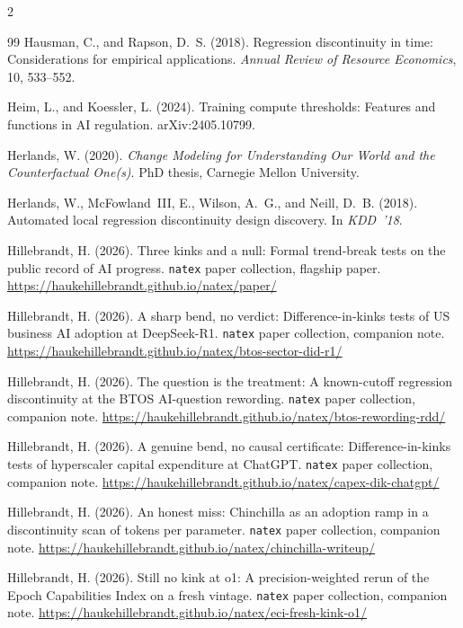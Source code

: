 \documentclass[11pt]{article}
\newcommand{\natex}{\texttt{natex}}
\begin{document}
\begin{multicols}{2}
\begin{thebibliography}{99}
Hausman, C., and Rapson, D.~S. (2018).
Regression discontinuity in time: Considerations for empirical applications.
\emph{Annual Review of Resource Economics}, 10, 533--552.

Heim, L., and Koessler, L. (2024).
Training compute thresholds: Features and functions in AI regulation.
arXiv:2405.10799.

Herlands, W. (2020).
\emph{Change Modeling for Understanding Our World and the Counterfactual
One(s)}.
PhD thesis, Carnegie Mellon University.

Herlands, W., McFowland~III, E., Wilson, A.~G., and Neill, D.~B. (2018).
Automated local regression discontinuity design discovery.
In \emph{KDD~'18}.

Hillebrandt, H. (2026).
Three kinks and a null: Formal trend-break tests on the public record of AI
progress.
\natex{} paper collection, flagship paper.
\url{https://haukehillebrandt.github.io/natex/paper/}

Hillebrandt, H. (2026).
A sharp bend, no verdict: Difference-in-kinks tests of US business AI
adoption at DeepSeek-R1.
\natex{} paper collection, companion note.
\url{https://haukehillebrandt.github.io/natex/btos-sector-did-r1/}

Hillebrandt, H. (2026).
The question is the treatment: A known-cutoff regression discontinuity at
the BTOS AI-question rewording.
\natex{} paper collection, companion note.
\url{https://haukehillebrandt.github.io/natex/btos-rewording-rdd/}

Hillebrandt, H. (2026).
A genuine bend, no causal certificate: Difference-in-kinks tests of
hyperscaler capital expenditure at ChatGPT.
\natex{} paper collection, companion note.
\url{https://haukehillebrandt.github.io/natex/capex-dik-chatgpt/}

Hillebrandt, H. (2026).
An honest miss: Chinchilla as an adoption ramp in a discontinuity scan of
tokens per parameter.
\natex{} paper collection, companion note.
\url{https://haukehillebrandt.github.io/natex/chinchilla-writeup/}

Hillebrandt, H. (2026).
Still no kink at o1: A precision-weighted rerun of the Epoch Capabilities
Index on a fresh vintage.
\natex{} paper collection, companion note.
\url{https://haukehillebrandt.github.io/natex/eci-fresh-kink-o1/}


\end{thebibliography}
\end{multicols}
\end{document}
